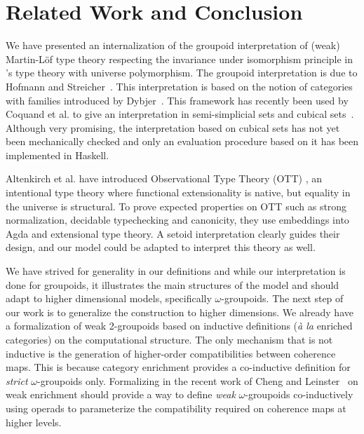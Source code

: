 
\section{Related Work and Conclusion}
\label{sec:conclusion}

We have presented an internalization of the groupoid interpretation of
(weak) Martin-Löf type theory respecting the invariance under
isomorphism principle in \Coq's type theory with universe polymorphism.
%
The groupoid interpretation is due to Hofmann
and Streicher~\cite{groupoid-interp}. This interpretation is based on
the notion of categories with families introduced by
Dybjer~\cite{dybjer:internaltt}. 
%
This framework has recently been used by Coquand et al. to give an
interpretation in semi-simplicial sets and cubical
sets~\cite{barras:_gener_takeut_gandy_inter,coquand:cubical}.
%
Although very promising, the interpretation based on cubical sets has not
yet been mechanically checked and only an evaluation procedure based on
it has been implemented in Haskell.

Altenkirch et al. have introduced Observational Type Theory (OTT)
\cite{altenkirch-mcbride-wierstra:ott-now}, an intentional type theory where
functional extensionality is native, but equality in the universe is structural.
%
To prove expected properties on OTT such as strong normalization,
decidable typechecking and canonicity, they use embeddings into Agda and
extensional type theory. A setoid interpretation clearly guides their
design, and our model could be adapted to interpret this theory as well.

We have strived for generality in our definitions and while our
interpretation is done for groupoids, it illustrates the main structures of the
model and should adapt to higher dimensional models, specifically
$\omega$-groupoids.
%
The next step of our work is to generalize the construction to higher
dimensions. We already have a formalization of weak 2-groupoids based
on inductive definitions (\emph{à la} enriched categories) on the
computational structure.
%
The only mechanism that is not inductive is the generation of
higher-order compatibilities between coherence maps. 
%
This is because category enrichment provides a co-inductive definition
for \emph{strict} $\omega$-groupoids only. Formalizing in \Coq the recent work
of Cheng and Leinster~\cite{cheng2012weak} on weak enrichment should
provide a way to define \emph{weak} $\omega$-groupoids co-inductively using
operads to parameterize the compatibility required on coherence maps at
higher levels.
  

